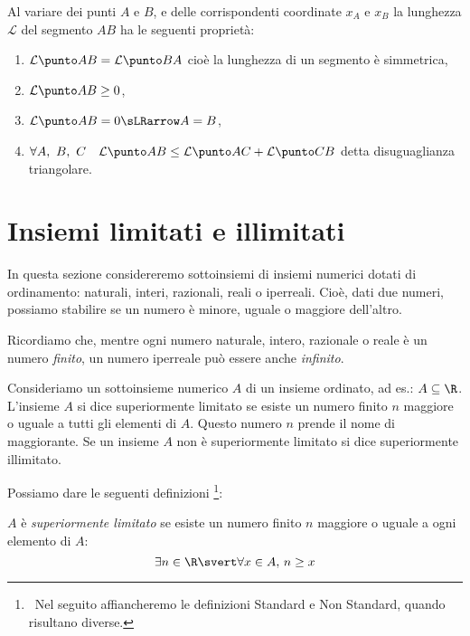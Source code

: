 Al variare dei punti \(A\) e \(B\), e delle corrispondenti coordinate 
\(x_A\) e \(x_B\) la lunghezza \(\mathcal{L}\) del segmento \(AB\) ha le 
seguenti proprietà:
\begin{enumerate}
\item \(\lung{A}{B} = \lung{B}{A}\) 
cioè la lunghezza di un segmento è simmetrica,
\item \(\lung{A}{B} \geq 0\),
\item \(\lung{A}{B} = 0 \sLRarrow A = B\),
\item \(\forall A,~B,~C \quad \lung{A}{B} \leq \lung{A}{C} + \lung{C}{B}\) 
detta disuguaglianza triangolare.
\end{enumerate}

\section{Insiemi limitati e illimitati}
\label{sec:topologiainsiemi}

In questa sezione considereremo sottoinsiemi di insiemi numerici dotati di 
ordinamento: naturali, interi, razionali, reali o iperreali. 
Cioè, dati due numeri, possiamo stabilire se un numero è minore, uguale o 
maggiore dell'altro.

Ricordiamo che, mentre ogni numero naturale, intero, razionale o reale è un 
numero \emph{finito}, un numero iperreale può essere anche \emph{infinito}.

Consideriamo un sottoinsieme numerico \(A\) di un insieme ordinato, ad es.: 
\(A \subseteq \R\). 
L'insieme \(A\) si dice superiormente limitato se esiste un numero finito 
\(n\) maggiore o uguale a tutti gli elementi di \(A\). 
Questo numero \(n\) prende il nome di maggiorante. 
Se un insieme \(A\) non è superiormente limitato si dice superiormente 
illimitato.

Possiamo dare le seguenti definizioni
\footnote{~Nel seguito affiancheremo le definizioni Standard e Non 
Standard, quando risultano diverse.}:

\begin{newdef}{}{}
\(A\) è \emph{superiormente limitato} se esiste un numero finito \(n\) 
maggiore o uguale a ogni elemento di \(A\):
\[\exists n \in \R \svert \forall x \in A,\, n \geq x\]
\end{newdef}


